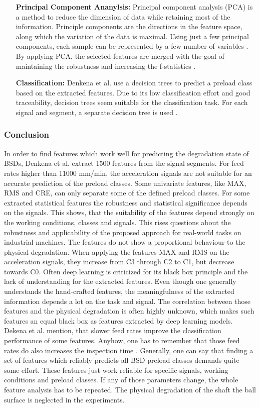\begin{itemize}
    \item [\textbf{Principal Component Ananylsis:}] 
    Principal component analysis (PCA) is a method to reduce the dimension of data while retaining most of the information. Principle components are the directions in the feature space, along which the variation of the data is maximal. Using just a few principal components, each sample can be represented by a few number of variables \cite{Ringner2008}. By applying PCA, the selected features are merged with the goal of maintaining the robustness and increasing the f-statistics \cite{Denkena2021}.
    
    \item [\textbf{Classification:}] Denkena et al. use a decision trees to predict a preload class based on the extracted features. Due to its low classification effort and good traceability, decision trees seem suitable for the classification task. For each signal and segment, a separate decision tree is used  \cite{Denkena2021}. 
\end{itemize}

\subsubsection{Conclusion}
In order to find features which work well for predicting the degradation state of BSDs, Denkena et al. extract 1500 features from the signal segments. For feed rates higher than 11000 mm/min, the acceleration signals are not suitable for an accurate prediction of the preload classes. Some univariate features, like MAX, RMS and CRE, can only separate some of the defined preload classes. For some extracted statistical features the robustness and statistical significance depends on the signals. This shows, that the suitability of the features depend strongly on the working conditions, classes and signals. This rises questions about the robustness and applicability of the proposed approach for real-world tasks on industrial machines. The features do not show a proportional behaviour to the physical degradation. When applying the features MAX and RMS on the acceleration signals, they increase from C3 through C2 to C1, but decrease towards C0. Often deep learning is criticized for its black box principle and the lack of understanding for the extracted features. Even though one generally understands the hand-crafted features, the meaningfulness of the extracted information depends a lot on the task and signal. The correlation between those features and the physical degradation is often highly unknown, which makes such features an equal black box as features extracted by deep learning models. Dekena et al. mention, that slower feed rates improve the classification performance of some features. Anyhow, one has to remember that those feed rates do also increases the inspection time . Generally, one can say that finding a set of features which reliably predicts all BSD preload classes demands quite some effort. These features just work reliable for specific signals, working conditions and preload classes. If any of those parameters change, the whole feature analysis has to be repeated. The physical degradation of the shaft the ball surface is neglected in the experiments.

